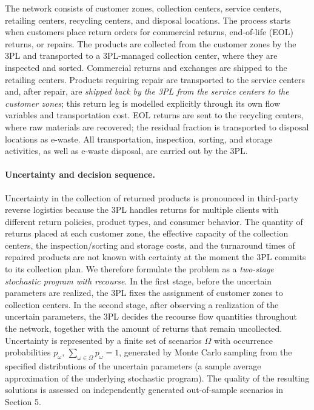 \documentclass[11pt, a4paper]{article}
\begin{document}
The network consists of customer zones, collection centers, service centers, retailing centers, recycling centers, and disposal locations. The process starts when customers place return orders for commercial returns, end-of-life (EOL) returns, or repairs. The products are collected from the customer zones by the 3PL and transported to a 3PL-managed collection center, where they are inspected and sorted. Commercial returns and exchanges are shipped to the retailing centers. Products requiring repair are transported to the service centers and, after repair, are \emph{shipped back by the 3PL from the service centers to the customer zones}; this return leg is modelled explicitly through its own flow variables and transportation cost. EOL returns are sent to the recycling centers, where raw materials are recovered; the residual fraction is transported to disposal locations as e-waste. All transportation, inspection, sorting, and storage activities, as well as e-waste disposal, are carried out by the 3PL.

\paragraph{Uncertainty and decision sequence.} Uncertainty in the collection of returned products is pronounced in third-party reverse logistics because the 3PL handles returns for multiple clients with different return policies, product types, and consumer behavior. The quantity of returns placed at each customer zone, the effective capacity of the collection centers, the inspection/sorting and storage costs, and the turnaround times of repaired products are not known with certainty at the moment the 3PL commits to its collection plan. We therefore formulate the problem as a \emph{two-stage stochastic program with recourse}. In the first stage, before the uncertain parameters are realized, the 3PL fixes the assignment of customer zones to collection centers. In the second stage, after observing a realization of the uncertain parameters, the 3PL decides the recourse flow quantities throughout the network, together with the amount of returns that remain uncollected. Uncertainty is represented by a finite set of scenarios $\Omega$ with occurrence probabilities $p_{\omega}$, $\sum\limits_{\omega \in \Omega} p_{\omega} = 1$, generated by Monte Carlo sampling from the specified distributions of the uncertain parameters (a sample average approximation of the underlying stochastic program). The quality of the resulting solutions is assessed on independently generated out-of-sample scenarios in Section 5.
\end{document}
